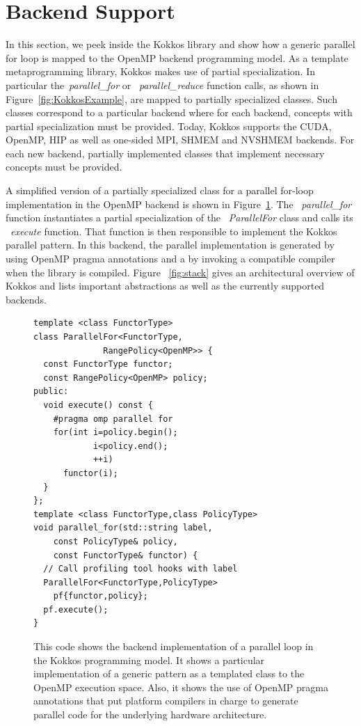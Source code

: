 
\section{Backend Support}\label{chap:backend}

In this section, we peek inside the Kokkos library and show how a generic parallel for loop is mapped to the OpenMP backend programming model. As a template metaprogramming library, Kokkos makes use of partial specialization. In particular the~\emph{parallel\_for} or ~\emph{parallel\_reduce} function calls, as shown in Figure~\ref{fig:KokkosExample}, are mapped to partially specialized classes. Such classes correspond to a particular backend where for each backend, concepts with partial specialization must be provided. Today, Kokkos supports the CUDA, OpenMP, HIP as well as one-sided MPI, SHMEM and NVSHMEM backends. For each new backend, partially implemented classes that implement necessary concepts must be provided.

A simplified version of a partially specialized class for a parallel for-loop implementation in the OpenMP backend is shown in Figure~\ref{fig:KokkosExampleOMPBackEnd}. The ~\emph{parallel\_for} function instantiates a partial specialization of the ~\emph{ParallelFor} class and calls its ~\emph{execute} function. That function is then responsible to implement the Kokkos parallel pattern. In this backend, the parallel implementation is generated by using OpenMP pragma annotations and a by invoking a compatible compiler when the library is compiled. Figure ~\ref{fig:stack} gives an architectural overview of Kokkos and lists important abstractions as well as the currently supported backends.
\begin{figure}[t!]
\begin{small}
\begin{verbatim}
template <class FunctorType>
class ParallelFor<FunctorType,
              RangePolicy<OpenMP>> {
  const FunctorType functor;
  const RangePolicy<OpenMP> policy; 
public:
  void execute() const {
    #pragma omp parallel for
    for(int i=policy.begin();
            i<policy.end();
            ++i)
      functor(i);
  }
};
template <class FunctorType,class PolicyType>
void parallel_for(std::string label, 
    const PolicyType& policy,
    const FunctorType& functor) {
  // Call profiling tool hooks with label
  ParallelFor<FunctorType,PolicyType> 
    pf{functor,policy};
  pf.execute();
}
\end{verbatim}
\end{small}
\caption{This code shows the backend implementation of a parallel loop in the Kokkos programming model. It shows a particular implementation of a generic pattern as a templated class to the OpenMP execution space. Also, it shows the use of OpenMP pragma annotations that put platform compilers in charge to generate parallel code for the underlying hardware architecture.}
\label{fig:KokkosExampleOMPBackEnd}
\end{figure}

